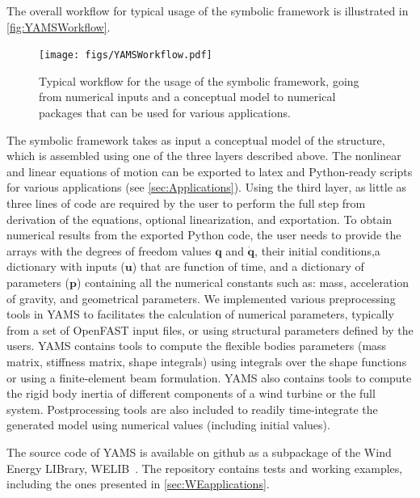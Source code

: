 \documentclass[wes, manuscript]{copernicus}
\renewcommand{\v}[1]{\boldsymbol{#1}}
\begin{document}
The overall workflow for typical usage of the symbolic framework is illustrated in \autoref{fig:YAMSWorkflow}.
\noindent\begin{figure}[!htb]\centering%
  \texttt{[image: figs/YAMSWorkflow.pdf]}
  \caption{Typical workflow for the usage of the symbolic framework, going from numerical inputs and a conceptual model to numerical packages that can be used for various applications.}\label{fig:YAMSWorkflow}%
\end{figure}
The symbolic framework takes as input a conceptual model of the structure, which is assembled using one of the three layers described above. 
The nonlinear and linear equations of motion can be exported to latex and Python-ready scripts for various applications (see \autoref{sec:Applications}).
Using the third layer, as little as three lines of code are required by the user to perform the full step from derivation of the equations, optional linearization, and exportation.
% 
To obtain numerical results from the exported Python code, the user needs to provide the arrays with the degrees of freedom values $\v{q}$ and $\v{\dot{q}}$, their initial conditions,a dictionary with inputs ($\v{u}$) that are function of time, and a dictionary of parameters ($\v{p}$) containing all the numerical constants such as: mass, acceleration of gravity, and geometrical parameters.
We implemented various preprocessing tools in YAMS to facilitates the calculation of numerical parameters, typically from a set of OpenFAST input files, or using structural parameters defined by the users. YAMS contains tools to compute the flexible bodies parameters (mass matrix, stiffness matrix, shape integrals) using integrals over the shape functions or using a finite-element beam formulation.
YAMS also contains tools to compute the rigid body inertia of different components of a wind turbine or the full system. Postprocessing tools are also included to readily time-integrate the generated model using numerical values (including initial values).


The source code of YAMS is available on github as a subpackage of the Wind Energy LIBrary, WELIB~\citep{WELIBgithub}.  
The repository contains tests and working examples, including the ones presented in \autoref{sec:WEapplications}.
\end{document}
